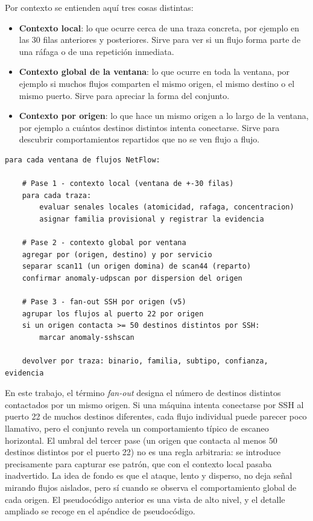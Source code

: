 Por contexto se entienden aquí tres cosas distintas:

\begin{itemize}
  \item \textbf{Contexto local}: lo que ocurre cerca de una traza concreta, por ejemplo en las 30 filas anteriores y posteriores. Sirve para ver si un flujo forma parte de una ráfaga o de una repetición inmediata.
  \item \textbf{Contexto global de la ventana}: lo que ocurre en toda la ventana, por ejemplo si muchos flujos comparten el mismo origen, el mismo destino o el mismo puerto. Sirve para apreciar la forma del conjunto.
  \item \textbf{Contexto por origen}: lo que hace un mismo origen a lo largo de la ventana, por ejemplo a cuántos destinos distintos intenta conectarse. Sirve para descubrir comportamientos repartidos que no se ven flujo a flujo.
\end{itemize}

\begin{verbatim}
para cada ventana de flujos NetFlow:

    # Pase 1 - contexto local (ventana de +-30 filas)
    para cada traza:
        evaluar senales locales (atomicidad, rafaga, concentracion)
        asignar familia provisional y registrar la evidencia

    # Pase 2 - contexto global por ventana
    agregar por (origen, destino) y por servicio
    separar scan11 (un origen domina) de scan44 (reparto)
    confirmar anomaly-udpscan por dispersion del origen

    # Pase 3 - fan-out SSH por origen (v5)
    agrupar los flujos al puerto 22 por origen
    si un origen contacta >= 50 destinos distintos por SSH:
        marcar anomaly-sshscan

    devolver por traza: binario, familia, subtipo, confianza, evidencia
\end{verbatim}

En este trabajo, el término \emph{fan-out} designa el número de destinos distintos contactados por un mismo origen. Si una máquina intenta conectarse por SSH al puerto 22 de muchos destinos diferentes, cada flujo individual puede parecer poco llamativo, pero el conjunto revela un comportamiento típico de escaneo horizontal. El umbral del tercer pase (un origen que contacta al menos 50 destinos distintos por el puerto 22) no es una regla arbitraria: se introduce precisamente para capturar ese patrón, que con el contexto local pasaba inadvertido. La idea de fondo es que el ataque, lento y disperso, no deja señal mirando flujos aislados, pero sí cuando se observa el comportamiento global de cada origen. El pseudocódigo anterior es una vista de alto nivel, y el detalle ampliado se recoge en el apéndice de pseudocódigo.

